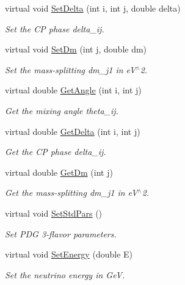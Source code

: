 \begin{DoxyCompactItemize}
virtual void \hyperlink{classOscProb_1_1PMNS__Base_a4bef78cfcfc4e70b4ce79cdb8862c0a3}{Set\+Delta} (int i, int j, double delta)
\begin{DoxyCompactList}\small\item\em Set the CP phase delta\+\_\+ij. \end{DoxyCompactList}\item 
virtual void \hyperlink{classOscProb_1_1PMNS__Base_a492243b22fb1b783cd2943f507cff970}{Set\+Dm} (int j, double dm)
\begin{DoxyCompactList}\small\item\em Set the mass-\/splitting dm\+\_\+j1 in e\+V$^\wedge$2. \end{DoxyCompactList}\item 
virtual double \hyperlink{classOscProb_1_1PMNS__Base_acee137091304c919642293ddf015bbc8}{Get\+Angle} (int i, int j)
\begin{DoxyCompactList}\small\item\em Get the mixing angle theta\+\_\+ij. \end{DoxyCompactList}\item 
virtual double \hyperlink{classOscProb_1_1PMNS__Base_adb8dbc91d4286d2e7c8f768c59476241}{Get\+Delta} (int i, int j)
\begin{DoxyCompactList}\small\item\em Get the CP phase delta\+\_\+ij. \end{DoxyCompactList}\item 
virtual double \hyperlink{classOscProb_1_1PMNS__Base_ad26815ac5f4805d1259817e4936e5f8f}{Get\+Dm} (int j)
\begin{DoxyCompactList}\small\item\em Get the mass-\/splitting dm\+\_\+j1 in e\+V$^\wedge$2. \end{DoxyCompactList}\item 
virtual void \hyperlink{classOscProb_1_1PMNS__Base_a4de96ac9b6d1e9b029ab877e57d211ad}{Set\+Std\+Pars} ()
\begin{DoxyCompactList}\small\item\em Set P\+DG 3-\/flavor parameters. \end{DoxyCompactList}\item 
virtual void \hyperlink{classOscProb_1_1PMNS__Base_a95b3b0d0cab5e6a54b5ef99587f837c0}{Set\+Energy} (double E)
\begin{DoxyCompactList}\small\item\em Set the neutrino energy in GeV. \end{DoxyCompactList}\item 

\end{DoxyCompactItemize}
